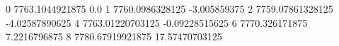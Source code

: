 0 7763.1044921875 0.0
1 7760.0986328125 -3.005859375
2 7759.07861328125 -4.02587890625
4 7763.01220703125 -0.09228515625
6 7770.326171875 7.2216796875
8 7780.67919921875 17.57470703125
